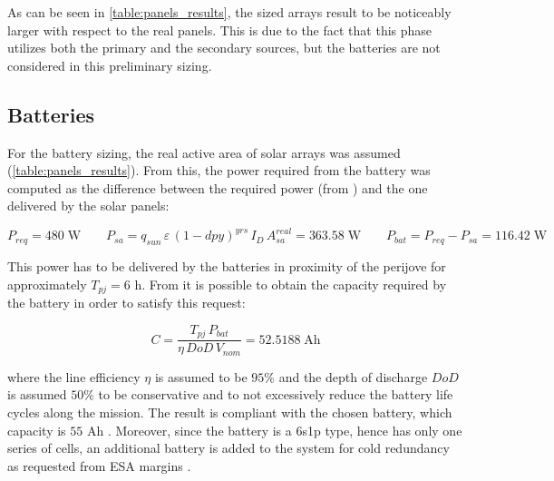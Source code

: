 As can be seen in \autoref{table:panels_results}, the sized arrays result to be noticeably larger with respect to the real panels.
This is due to the fact that this phase utilizes both the primary and the secondary sources, but the batteries are not considered in this preliminary sizing.


\subsection{Batteries}
\label{subsec:battery_sizing}

For the battery sizing, the real active area of solar arrays was assumed (\autoref{table:panels_results}).
From this, the power required from the battery was computed as the difference between the required power (from \mref) and the one delivered by the solar panels:

\begin{equation}
    P_{req} = 480 \; \textrm{W} \qquad
    P_{sa} = q_{sun} \, \varepsilon \, \left( 1 - dpy \right) ^ {yrs} \, I_D \, A_{sa}^{real} = 363.58 \; \textrm{W} \qquad
    P_{bat} = P_{req} - P_{sa} = 116.42 \; \textrm{W}
\end{equation}

This power has to be delivered by the batteries in proximity of the perijove for approximately $T_{pj} = 6$ h. From \mref it is possible to obtain the capacity required by the battery in order to satisfy this request:

\begin{equation}
    C = \frac{T_{pj} \, P_{bat}}{\eta \, DoD \, V_{nom}} = 52.5188 \; \textrm{Ah}
\end{equation}

where the line efficiency $\eta$ is assumed to be $95\%$ and the depth of discharge $DoD$ is assumed $50\%$ to be conservative and to not excessively reduce the battery life cycles along the mission. The result is compliant with the chosen battery, which capacity is $55$ Ah \mref.
Moreover, since the battery is a 6s1p type, hence has only one series of cells, an additional battery is added to the system for cold redundancy as requested from ESA margins \mref.

